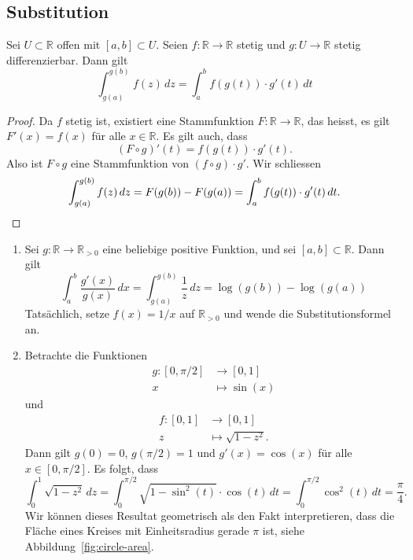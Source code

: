 \documentclass[../main.tex]{subfiles}
\begin{document}
\subsection*{Substitution}
\begin{substitution}
  Sei $U \subset \mathbb{R}$ offen
  mit $[a, b] \subset U$.
  Seien $f \colon \mathbb{R} \to \mathbb{R}$ stetig
  und $g \colon U \to \mathbb{R}$ stetig differenzierbar.
  Dann gilt
  \[
    \int_{g(a)}^{g(b)} f(z) \, dz
    = \int_{a}^{b} f(g(t)) \cdot g'(t) \, dt
  \]
\end{substitution}

\begin{proof}
  Da $f$ stetig ist, existiert
  eine Stammfunktion $F \colon \mathbb{R} \to \mathbb{R}$,
  das heisst,
  es gilt $F'(x) = f(x)$ für alle $x \in \mathbb{R}$.
  Es gilt auch, dass
  \[
    (F \circ g)'(t) = f(g(t)) \cdot g'(t).
  \]
  Also ist $F \circ g$ eine Stammfunktion
  von $(f \circ g) \cdot g'$.
  Wir schliessen
  \[
    \int_{g(a)}^{g(b)} f(z) \, dz
    = F(g(b)) - F(g(a))
    = \int_{a}^{b} f(g(t)) \cdot g'(t) \, dt. \qedhere
  \]
\end{proof}

\begin{examples}
  \leavevmode
  \begin{enumerate}[(1)]
    \item Sei $g \colon \mathbb{R} \to \mathbb{R}_{>0}$
      eine beliebige positive Funktion,
      und sei $[a, b] \subset \mathbb{R}$.
      Dann gilt
      \[
        \int_{a}^{b} \frac{g'(x)}{g(x)} \, dx
        = \int_{g(a)}^{g(b)} \frac{1}{z} \, dz
        = \log(g(b)) - \log(g(a))
      \]
      Tatsächlich, setze $f(x) = 1/x$ auf $\mathbb{R}_{>0}$
      und wende die Substitutionsformel an.
    \item Betrachte die Funktionen
      \begin{align*}
        g \colon [0, \pi/2] & \to [0, 1] \\
        x & \mapsto \sin(x)
      \end{align*}
      und
      \begin{align*}
        f \colon [0, 1] & \to [0, 1] \\
        z & \mapsto \sqrt{1- z^2}.
      \end{align*}
      Dann gilt $g(0) = 0$, $g(\pi/2) = 1$
      und $g'(x) = \cos(x)$ für alle $x \in [0, \pi/2]$.
      Es folgt, dass
      \[
        \int_{0}^{1} \sqrt{1 - z^2} \, dz
        = \int_{0}^{\pi/2} \sqrt{1 - \sin^2(t)}
        \cdot \cos(t)\, dt
        = \int_{0}^{\pi/2} \cos^2(t) \, dt
        = \frac{\pi}{4}.
      \]
      Wir können dieses Resultat geometrisch als den Fakt
      interpretieren, dass die Fläche eines Kreises
      mit Einheitsradius gerade $\pi$ ist, siehe
      Abbildung~\ref{fig:circle-area}.
  \end{enumerate}
\end{examples}
\end{document}

